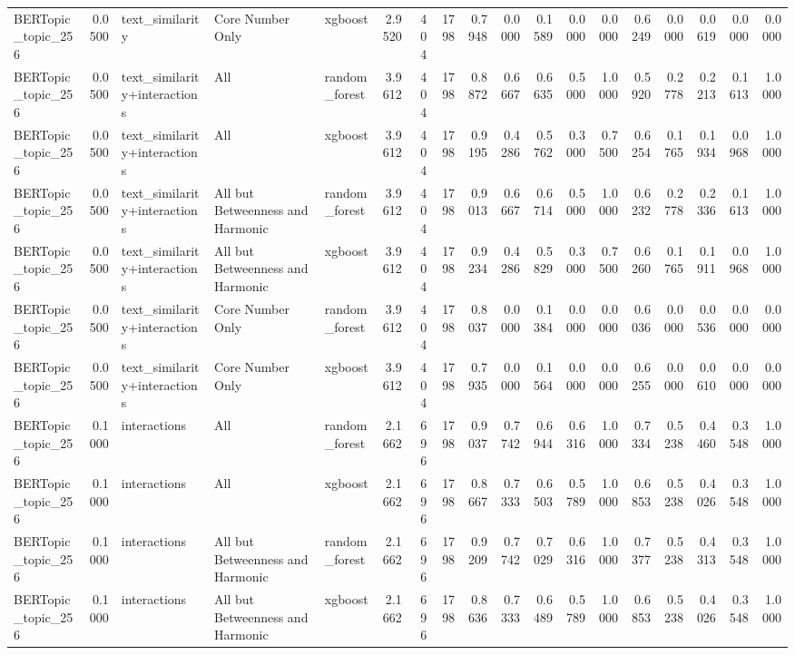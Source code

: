 \begin{tabular}{lrlllrrrrrrrrrrrrr}
BERTopic_topic_256 & 0.0500 & text_similarity & Core Number Only & xgboost & 2.9520 & 404 & 1798 & 0.7948 & 0.0000 & 0.1589 & 0.0000 & 0.0000 & 0.6249 & 0.0000 & 0.0619 & 0.0000 & 0.0000 \\
BERTopic_topic_256 & 0.0500 & text_similarity+interactions & All & random_forest & 3.9612 & 404 & 1798 & 0.8872 & 0.6667 & 0.6635 & 0.5000 & 1.0000 & 0.5920 & 0.2778 & 0.2213 & 0.1613 & 1.0000 \\
BERTopic_topic_256 & 0.0500 & text_similarity+interactions & All & xgboost & 3.9612 & 404 & 1798 & 0.9195 & 0.4286 & 0.5762 & 0.3000 & 0.7500 & 0.6254 & 0.1765 & 0.1934 & 0.0968 & 1.0000 \\
BERTopic_topic_256 & 0.0500 & text_similarity+interactions & All but Betweenness and Harmonic & random_forest & 3.9612 & 404 & 1798 & 0.9013 & 0.6667 & 0.6714 & 0.5000 & 1.0000 & 0.6232 & 0.2778 & 0.2336 & 0.1613 & 1.0000 \\
BERTopic_topic_256 & 0.0500 & text_similarity+interactions & All but Betweenness and Harmonic & xgboost & 3.9612 & 404 & 1798 & 0.9234 & 0.4286 & 0.5829 & 0.3000 & 0.7500 & 0.6260 & 0.1765 & 0.1911 & 0.0968 & 1.0000 \\
BERTopic_topic_256 & 0.0500 & text_similarity+interactions & Core Number Only & random_forest & 3.9612 & 404 & 1798 & 0.8037 & 0.0000 & 0.1384 & 0.0000 & 0.0000 & 0.6036 & 0.0000 & 0.0536 & 0.0000 & 0.0000 \\
BERTopic_topic_256 & 0.0500 & text_similarity+interactions & Core Number Only & xgboost & 3.9612 & 404 & 1798 & 0.7935 & 0.0000 & 0.1564 & 0.0000 & 0.0000 & 0.6255 & 0.0000 & 0.0610 & 0.0000 & 0.0000 \\
BERTopic_topic_256 & 0.1000 & interactions & All & random_forest & 2.1662 & 696 & 1798 & 0.9037 & 0.7742 & 0.6944 & 0.6316 & 1.0000 & 0.7334 & 0.5238 & 0.4460 & 0.3548 & 1.0000 \\
BERTopic_topic_256 & 0.1000 & interactions & All & xgboost & 2.1662 & 696 & 1798 & 0.8667 & 0.7333 & 0.6503 & 0.5789 & 1.0000 & 0.6853 & 0.5238 & 0.4026 & 0.3548 & 1.0000 \\
BERTopic_topic_256 & 0.1000 & interactions & All but Betweenness and Harmonic & random_forest & 2.1662 & 696 & 1798 & 0.9209 & 0.7742 & 0.7029 & 0.6316 & 1.0000 & 0.7377 & 0.5238 & 0.4313 & 0.3548 & 1.0000 \\
BERTopic_topic_256 & 0.1000 & interactions & All but Betweenness and Harmonic & xgboost & 2.1662 & 696 & 1798 & 0.8636 & 0.7333 & 0.6489 & 0.5789 & 1.0000 & 0.6853 & 0.5238 & 0.4026 & 0.3548 & 1.0000 \\

\end{tabular}
